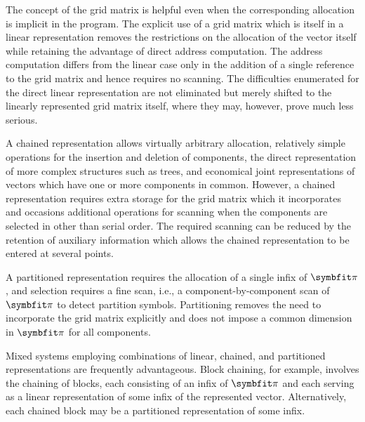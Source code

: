\par The concept of the grid matrix is helpful even when the corresponding allocation is implicit in the program. The explicit use of a grid matrix which is itself in a linear representation removes the restrictions on the allocation of the vector itself while retaining the advantage of direct address computation. The address computation differs from the linear case only in the addition of a single reference to the grid matrix and hence requires no scanning. The difficulties enumerated for the direct linear representation are not eliminated but merely shifted to the linearly represented grid matrix itself, where they may, however, prove much less serious.

\par A chained representation allows virtually arbitrary allocation, relatively simple operations for the insertion and deletion of components, the direct representation of more complex structures such as trees, and economical joint representations of vectors which have one or more components in common. However, a chained representation requires extra storage for the grid matrix which it incorporates and occasions additional operations for scanning when the components are selected in other than serial order. The required scanning can be reduced by the retention of auxiliary information which allows the chained representation to be entered at several points.

\par A partitioned representation requires the allocation of a single infix of $\vect{\pi}$, and selection requires a fine scan, i.e., a component-by-component scan of $\vect{\pi}$ to detect partition symbols. Partitioning removes the need to incorporate the grid matrix explicitly and does not impose a common dimension in $\vect{\pi}$ for all components.

\par Mixed systems employing combinations of linear, chained, and partitioned representations are frequently advantageous. Block chaining, for example, involves the chaining of blocks, each consisting of an infix of $\vect{\pi}$ and each serving as a linear representation of some infix of the represented vector. Alternatively, each chained block may be a partitioned representation of some infix.
